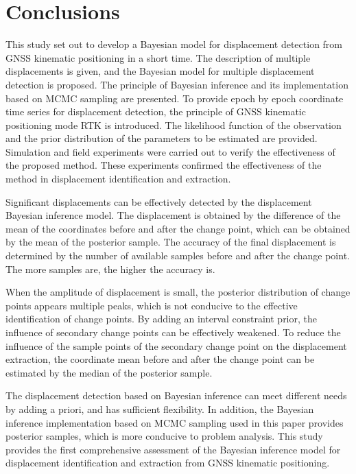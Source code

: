 \documentclass[journal]{IEEEtran}
\begin{document}
\section{Conclusions}
\label{concl}
This study set out to develop a Bayesian model for displacement detection from GNSS kinematic positioning in a short time. 
The description of multiple displacements is given, and the Bayesian model for multiple displacement detection is proposed.
The principle of Bayesian inference and its implementation based on MCMC sampling are presented.
To provide epoch by epoch coordinate time series for displacement detection, the principle of GNSS kinematic positioning mode RTK is introduced.
The likelihood function of the observation and the prior distribution of the parameters to be estimated are provided.
Simulation and field experiments were carried out to verify the effectiveness of the proposed method. 
These experiments confirmed the effectiveness of the method in displacement identification and extraction.

Significant displacements can be effectively detected by the displacement Bayesian inference model.
The displacement is obtained by the difference of the mean of the coordinates before and after the change point, which can be obtained by the mean of the posterior sample.
The accuracy of the final displacement is determined by the number of available samples before and after the change point.
The more samples are, the higher the accuracy is.

When the amplitude of displacement is small, the posterior distribution of change points appears multiple peaks, which is not conducive to the effective identification of change points.
By adding an interval constraint prior, the influence of secondary change points can be effectively weakened.
To reduce the influence of the sample points of the secondary change point on the displacement extraction, the coordinate mean before and after the change point can be estimated by the median of the posterior sample.

The displacement detection based on Bayesian inference can meet different needs by adding a priori, and has sufficient flexibility.
In addition, the Bayesian inference implementation based on MCMC sampling used in this paper provides posterior samples, which is more conducive to problem analysis.
This study provides the first comprehensive assessment of the Bayesian inference model for displacement identification and extraction from GNSS kinematic positioning.
	
\end{document}
